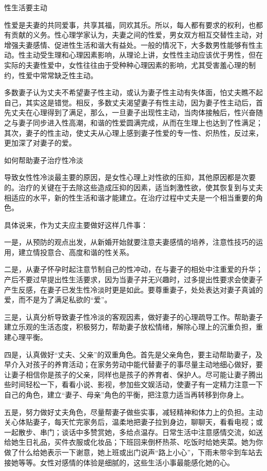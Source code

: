 \documentclass[12pt,UTF8,openany]{ctexbook}
\begin{document}
性生活要主动


性爱是夫妻的共同爱事，共享其福，同欢其乐。所以，每人都有要求的权利，也都有贡献的义务。性心理学家认为，夫妻之间的性爱，男女双方相互交替性主动，对增强夫妻感情、促进性生活和谐大有益处。一般的情况下，大多数男性能够有性主动。性主动受生理和心理因素影响，从理论上讲，女性性主动应该优于男性，但在实际的夫妻性爱中，女性往往由于受种种心理因素的影响，尤其受害羞心理的制约，性爱中常常缺乏性主动。

多数妻子认为丈夫不希望妻子性主动，或认为妻子性主动有失体面，怕丈夫瞧不起自己，其实这是错觉。相反，多数丈夫渴望妻子有性主动，因为妻子性主动后，首先丈夫在心理得到了满足，那么，一旦妻子出现性主动，当肉体接触后，性兴奋随之与妻子同步进入性高潮，和谐的性爱圆满完成，从而在生理上也达到了性满足；其次，妻子的性主动，使丈夫从心理上感到妻子性爱的专一性、炽热性，反过来，更加深了对妻子的爱。





如何帮助妻子治疗性冷淡


导致女性性冷淡最主要的原因，是女性心理上对性欲的压抑，其他原因都是次要的。治疗的关键在于去除这些造成压抑的因素，适当刺激性欲，使其恢复到与丈夫相适应的水平，新的性生活和谐才能建立。在治疗过程中丈夫是一个相当重要的角色。

具体说来，作为丈夫应主要做好这样几件事：

一是，从预防的观点出发，从新婚开始就要注意夫妻感情的培养，注意性技巧的运用，建立情投意合、高度和谐的性关系。

二是，从妻子怀孕时起注意节制自己的性冲动，在与妻子的相处中注重爱的升华；产后不要过早提出性生活要求，因为当妻子并无兴趣时，过多提出性要求会使妻子产生反感，在妻子已发生性冷淡时更是如此。要尊重妻子，处处表达对妻子真诚的爱，而不是为了满足私欲的“爱”。

三是，认真分析导致妻子性冷淡的客观因素，做好妻子的心理疏导工作。帮助妻子建立乐观的生活态度，积极努力，帮助妻子放松情绪，解除心理上的沉重负担，重建心理平衡。

四是，认真做好“丈夫、父亲”的双重角色。首先是父亲角色，要主动帮助妻子，及早介入对孩子的养育活动；在家务劳动中能代替妻子的事尽量主动地细心做好，要让妻子相信你是孩子的父亲，同样也是孩子的养育者、保护人。尽可能让妻子腾出些时间轻松一下，看看小说、影视，参加些文娱活动，使妻子有一定精力注意一下自己的角色，建立“妻子、母亲”角色的平衡，把注意力适当再转移到你身上。

五是，努力做好丈夫角色，尽量帮妻子做些实事，减轻精神和体力上的负担。主动关心体贴妻子，每天忙完家务后，温柔地把妻子拉到身边，聊聊天，看看电视；或一起散步、串门；谈话中多赞赏她，多给点温存。日常生活中注意感情交流，如送给她生日礼品，买件衣服或化妆品；下班回来倒杯热茶、吃饭时给她夹菜。她为你做了什么给她表示一下谢意，她上班或出门说声“路上小心”，下雨未带伞到车站去接她等等。女性对感情的体验是细腻的，这些生活小事最能感化她的心。
\end{document}
